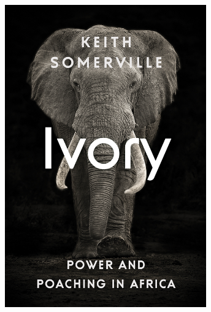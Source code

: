\documentclass[10pt]{beamer}
\begin{document}
\begin{frame}[t]
\begin{columns}
		\begin{column}{0.5\textwidth}
			\begin{center}
				\includegraphics[width=0.65\textwidth]{figures/ivory_book.jpg}
			\end{center}
		\end{column}
	\end{columns}
\end{frame}    
\end{document}
